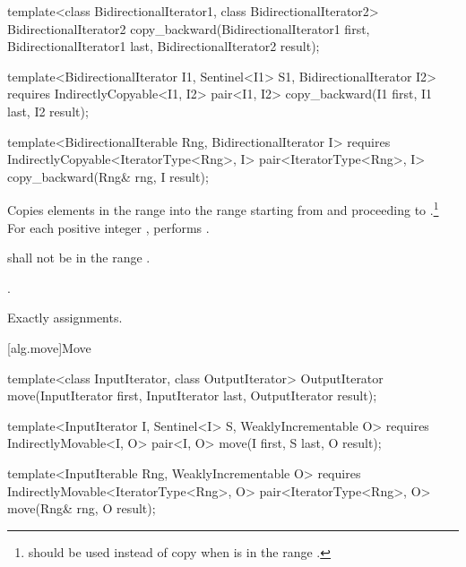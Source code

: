 %
\begin{removedblock}
\begin{itemdecl}
template<class BidirectionalIterator1, class BidirectionalIterator2>
  BidirectionalIterator2
    copy_backward(BidirectionalIterator1 first,
                  BidirectionalIterator1 last,
                  BidirectionalIterator2 result);
\end{itemdecl}
\end{removedblock}
\begin{addedblock}
\begin{itemdecl}
template<BidirectionalIterator I1, Sentinel<I1> S1, BidirectionalIterator I2>
  requires IndirectlyCopyable<I1, I2>
  pair<I1, I2>
    copy_backward(I1 first, I1 last, I2 result);

template<BidirectionalIterable Rng, BidirectionalIterator I>
  requires IndirectlyCopyable<IteratorType<Rng>, I>
  pair<IteratorType<Rng>, I>
    copy_backward(Rng& rng, I result);
\end{itemdecl}
\end{addedblock}

\begin{itemdescr}
\pnum
\effects
Copies elements in the range 
into the
range 
starting from
and proceeding to .\footnote{
should be used instead of copy when 
is in
the range
.}
For each positive integer
,
performs
.

\pnum
\requires
{}
shall not be in the range
.

\pnum
\returns
{}.

\pnum
\complexity
Exactly
assignments.
\end{itemdescr}

[alg.move]{Move}

%
\begin{removedblock}
\begin{itemdecl}
template<class InputIterator, class OutputIterator>
  OutputIterator move(InputIterator first, InputIterator last,
                      OutputIterator result);
\end{itemdecl}
\end{removedblock}
\begin{addedblock}
\begin{itemdecl}
template<InputIterator I, Sentinel<I> S, WeaklyIncrementable O>
  requires IndirectlyMovable<I, O>
  pair<I, O>
    move(I first, S last, O result);

template<InputIterable Rng, WeaklyIncrementable O>
  requires IndirectlyMovable<IteratorType<Rng>, O>
  pair<IteratorType<Rng>, O>
    move(Rng& rng, O result);
\end{itemdecl}
\end{addedblock}

